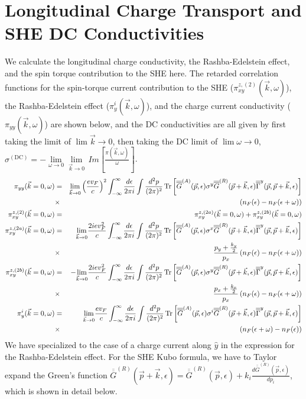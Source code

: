 \documentclass[letter,12pt,preprint,aps]{revtex4-1}
\newcommand{\ba}{\begin{eqnarray}}
\newcommand{\ea}{\end{eqnarray}}
\newcommand{\bl}{\left (}
\newcommand{\br}{\right )}
\newcommand{\Gbar}{\overline{\overline{G}}}
\newcommand{\Gammabar}{\overline{\overline{\Gamma}}}
\begin{document}
\section{Longitudinal Charge Transport and SHE DC Conductivities}

We calculate the longitudinal charge conductivity, the Rashba-Edelstein effect, and the spin torque contribution to the SHE here. The retarded correlation functions for the spin-torque current contribution to the SHE ($\pi^{z, (2)}_{xy}(\vec{k}, \omega)$), the Rashba-Edelstein effect ($\pi^{i}_{y}(\vec{k}, \omega)$), and the charge current conductivity ($\pi_{yy}(\vec{k}, \omega)$) are shown below, and the DC conductivities are all given by first taking the limit of $\lim \vec{k} \to 0$, then taking the DC limit of $\lim \omega \to 0$, $\sigma^{(\text{DC})} = - \underset{\omega \to 0}{\lim} \underset{\vec{k} \to 0}{\lim} \, Im [\tfrac{\pi(\vec{k}, \omega)}{\omega}]$.
%
\ba
\label{eqn: pizxy corr function}
\pi_{yy}(\vec{k} = 0, \omega) & = & \underset{\vec{k} \to 0}{\lim} \bl \frac{e v_F}{c} \br^2 \int_{-\infty}^{\infty} \frac{d \epsilon}{2 \pi i} \int \frac{d^2 p}{(2 \pi)^2} \Tr \left[ \Gbar^{(A)}(\vec{p}, \epsilon) \sigma^y \Gbar^{(R)}(\vec{p} + \vec{k}, \epsilon) \Gammabar^{y}(\vec{p}, \vec{p} + \vec{k}, \epsilon) \right] \cr
 & \times & \bl n_F(\epsilon) - n_F(\epsilon + \omega) \br \\
\pi^{z, (2)}_{xy}(\vec{k} = 0, \omega) & = & \pi^{z, (2a)}_{xy}(\vec{k} = 0, \omega) + \pi^{z, (2b)}_{xy}(\vec{k} = 0, \omega) \\
\pi^{z, (2a)}_{xy}(\vec{k} = 0, \omega) & = & \underset{\vec{k} \to 0}{\lim} \frac{2 i e v_F^2}{c} \int_{-\infty}^{\infty} \frac{d \epsilon}{2 \pi i} \int \frac{d^2 p}{(2 \pi)^2} \Tr \left[ \Gbar^{(A)}(\vec{p}, \epsilon) \sigma^x \Gbar^{(R)}(\vec{p} + \vec{k}, \epsilon) \Gammabar^{y}(\vec{p}, \vec{p} + \vec{k}, \epsilon) \right] \cr
 & \times & \frac{p_y + \frac{k_y}{2}}{p_x} \bl n_F(\epsilon) - n_F(\epsilon + \omega) \br \cr
\pi^{z, (2b)}_{xy}(\vec{k} = 0, \omega) & = & - \underset{\vec{k} \to 0}{\lim} \frac{2 i e v_F^2}{c} \int_{-\infty}^{\infty} \frac{d \epsilon}{2 \pi i} \int \frac{d^2 p}{(2 \pi)^2} \Tr \left[ \Gbar^{(A)}(\vec{p}, \epsilon) \sigma^y \Gbar^{(R)}(\vec{p} + \vec{k}, \epsilon) \Gammabar^{y}(\vec{p}, \vec{p} + \vec{k}, \epsilon) \right] \cr
& \times & \frac{p_x + \frac{k_x}{2}}{p_x} \bl n_F(\epsilon) - n_F(\epsilon  + \omega) \br \cr
\pi^{i}_{y}(\vec{k} = 0, \omega) & = & \underset{\vec{k} \to 0}{\lim} \frac{e v_F}{c} \int_{-\infty}^{\infty} \frac{d \epsilon}{2 \pi i} \int \frac{d^2 p}{(2 \pi)^2} \Tr \left[ \Gbar^{(A)}(\vec{p}, \epsilon) \sigma^i \Gbar^{(R)}(\vec{p} + \vec{k}, \epsilon) \Gammabar^{y}(\vec{p}, \vec{p} + \vec{k}, \epsilon) \right] \cr
& \times & \bl n_F(\epsilon + \omega) - n_F(\epsilon) \br
\ea
%
We have specialized to the case of a charge current along $\hat{y}$ in the expression for the Rashba-Edelstein effect. For the SHE Kubo formula, we have to Taylor expand the Green's function $\Gbar^{(R)}(\vec{p} + \vec{k}, \epsilon) = \Gbar^{(R)}(\vec{p}, \epsilon) + k_i \tfrac{d \Gbar^{(R)}(\vec{p}, \epsilon)}{d p_i}$, which is shown in detail below.
\end{document}
